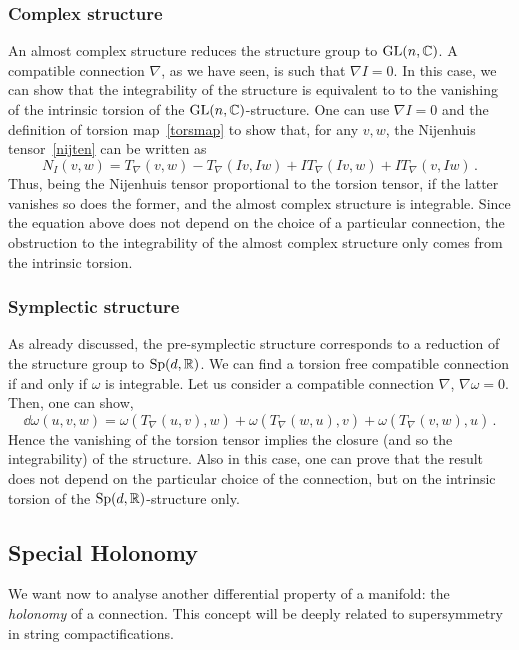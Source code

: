 \documentclass[debug]{phd}
\begin{document}
				\subsubsection{Complex structure}
						An almost complex structure reduces the structure group to $\mathrm{GL}(n, \mathbb{C})$.
						A compatible connection $\nabla$, as we have seen, is such that $\nabla I = 0$.
						In this case, we can show that the integrability of the structure is equivalent to to the vanishing of the intrinsic torsion of the $\mathrm{GL}(n, \mathbb{C})$-structure.
 						One can use $\nabla I = 0$ and the definition of torsion map~\eqref{torsmap} to show that, for any $v,w$, the Nijenhuis tensor~\eqref{nijten} can be written as
								\begin{equation}
									N_{I} (v, w) = T_{\nabla} (v,w) - T_{\nabla} (Iv, Iw) + I T_{\nabla} (Iv,w) + I T_{\nabla} (v, Iw) \, .
								\end{equation}
						Thus, being the Nijenhuis tensor proportional to the torsion tensor, if the latter vanishes so does the former, and the almost complex structure is integrable.
 						Since the equation above does not depend on the choice of a particular connection, the obstruction to the integrability of the almost complex structure only comes from the intrinsic torsion.
				\subsubsection{Symplectic structure}
						As already discussed, the pre-symplectic structure corresponds to a reduction of the structure group to $\mathrm{Sp}(d,\mathbb{R})$.
						We can find a torsion free compatible connection if and only if $\omega$ is integrable.
						Let us consider a compatible connection $\nabla$, $\nabla \omega = 0$.
						Then, one can show,
								\begin{equation}
									\dd \omega (u, v, w) = \omega(T_\nabla (u,v), w) + \omega(T_\nabla (w,u), v) + \omega(T_\nabla (v,w), u)\, .
								\end{equation}
						Hence the vanishing of the torsion tensor implies the closure (and so the integrability) of the structure.
						Also in this case, one can prove that the result does not depend on the particular choice of the connection, but on the intrinsic torsion of the $\mathrm{Sp}(d, \mathbb{R})$-structure only.
			\subsection{Special Holonomy}
					We want now to analyse another differential property of a manifold: the \emph{holonomy} of a connection.
					This concept will be deeply related to supersymmetry in string compactifications.
\end{document}
